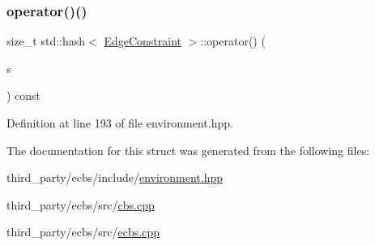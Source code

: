 \subsubsection{\texorpdfstring{operator()()}{operator()()}\hspace{0.1cm}{\footnotesize\ttfamily [3/3]}}
{\footnotesize\ttfamily size\+\_\+t std\+::hash$<$ \hyperlink{structlib_multi_robot_planning_1_1_edge_constraint}{Edge\+Constraint} $>$\+::operator() (\begin{DoxyParamCaption}\item[{const \hyperlink{structlib_multi_robot_planning_1_1_edge_constraint}{Edge\+Constraint} \&}]{s }\end{DoxyParamCaption}) const\hspace{0.3cm}{\ttfamily [inline]}}



Definition at line 193 of file environment.\+hpp.



The documentation for this struct was generated from the following files\+:\begin{DoxyCompactItemize}
\item 
third\+\_\+party/ecbs/include/\hyperlink{environment_8hpp}{environment.\+hpp}\item 
third\+\_\+party/ecbs/src/\hyperlink{cbs_8cpp}{cbs.\+cpp}\item 
third\+\_\+party/ecbs/src/\hyperlink{ecbs_8cpp}{ecbs.\+cpp}\end{DoxyCompactItemize}
